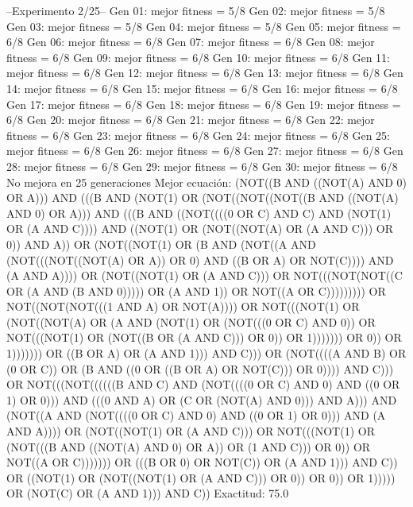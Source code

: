 --Experimento 
 2/25--
Gen 01: mejor fitness = 5/8
Gen 02: mejor fitness = 5/8
Gen 03: mejor fitness = 5/8
Gen 04: mejor fitness = 5/8
Gen 05: mejor fitness = 6/8
Gen 06: mejor fitness = 6/8
Gen 07: mejor fitness = 6/8
Gen 08: mejor fitness = 6/8
Gen 09: mejor fitness = 6/8
Gen 10: mejor fitness = 6/8
Gen 11: mejor fitness = 6/8
Gen 12: mejor fitness = 6/8
Gen 13: mejor fitness = 6/8
Gen 14: mejor fitness = 6/8
Gen 15: mejor fitness = 6/8
Gen 16: mejor fitness = 6/8
Gen 17: mejor fitness = 6/8
Gen 18: mejor fitness = 6/8
Gen 19: mejor fitness = 6/8
Gen 20: mejor fitness = 6/8
Gen 21: mejor fitness = 6/8
Gen 22: mejor fitness = 6/8
Gen 23: mejor fitness = 6/8
Gen 24: mejor fitness = 6/8
Gen 25: mejor fitness = 6/8
Gen 26: mejor fitness = 6/8
Gen 27: mejor fitness = 6/8
Gen 28: mejor fitness = 6/8
Gen 29: mejor fitness = 6/8
Gen 30: mejor fitness = 6/8
No mejora en 25 generaciones
Mejor ecuación: (NOT((B AND ((NOT(A) AND 0) OR A))) AND (((B AND (NOT(1) OR (NOT((NOT((NOT((B AND ((NOT(A) AND 0) OR A))) AND (((B AND ((NOT((((0 OR C) AND C) AND (NOT(1) OR (A AND C)))) AND ((NOT(1) OR (NOT((NOT(A) OR (A AND C))) OR 0)) AND A)) OR (NOT((NOT(1) OR (B AND (NOT((A AND (NOT(((NOT((NOT(A) OR A)) OR 0) AND ((B OR A) OR NOT(C)))) AND (A AND A)))) OR (NOT((NOT(1) OR (A AND C))) OR NOT(((NOT(NOT((C OR (A AND (B AND 0))))) OR (A AND 1)) OR NOT((A OR C))))))))) OR NOT((NOT(NOT(((1 AND A) OR NOT(A)))) OR NOT(((NOT(1) OR (NOT((NOT(A) OR (A AND (NOT(1) OR (NOT(((0 OR C) AND 0)) OR NOT(((NOT(1) OR (NOT((B OR (A AND C))) OR 0)) OR 1))))))) OR 0)) OR 1))))))) OR ((B OR A) OR (A AND 1))) AND C))) OR (NOT((((A AND B) OR (0 OR C)) OR (B AND ((0 OR ((B OR A) OR NOT(C))) OR 0)))) AND C))) OR NOT(((NOT((((((B AND C) AND (NOT((((0 OR C) AND 0) AND ((0 OR 1) OR 0))) AND (((0 AND A) OR (C OR (NOT(A) AND 0))) AND A))) AND (NOT((A AND (NOT((((0 OR C) AND 0) AND ((0 OR 1) OR 0))) AND (A AND A)))) OR (NOT((NOT(1) OR (A AND C))) OR NOT(((NOT(1) OR (NOT(((B AND ((NOT(A) AND 0) OR A)) OR (1 AND C))) OR 0)) OR NOT((A OR C))))))) OR (((B OR 0) OR NOT(C)) OR (A AND 1))) AND C)) OR ((NOT(1) OR (NOT((NOT(1) OR (A AND C))) OR 0)) OR 0)) OR 1))))) OR (NOT(C) OR (A AND 1))) AND C))
 Exactitud: 75.0%

